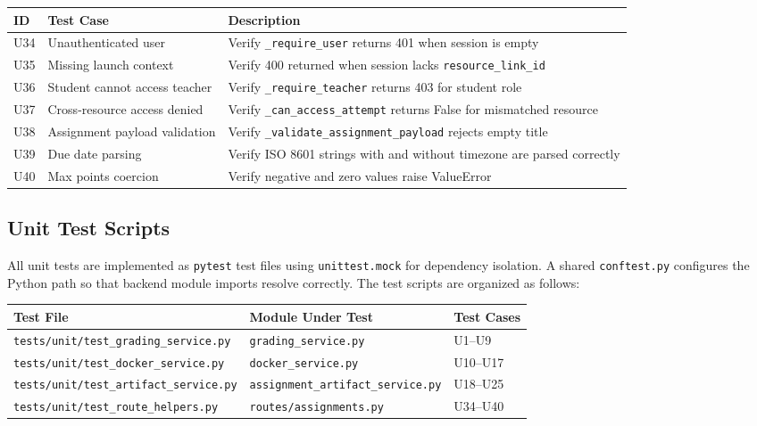 \documentclass[12pt, letterpaper]{article}
\begin{document}
\begin{longtable}{p{0.5cm} p{4.5cm} p{8.5cm}}
    \toprule
    \textbf{ID} & \textbf{Test Case} & \textbf{Description} \\
    \midrule
    U34 & Unauthenticated user & Verify \texttt{\_require\_user} returns 401 when session is empty \\
    U35 & Missing launch context & Verify 400 returned when session lacks \texttt{resource\_link\_id} \\
    U36 & Student cannot access teacher & Verify \texttt{\_require\_teacher} returns 403 for student role \\
    U37 & Cross-resource access denied & Verify \texttt{\_can\_access\_attempt} returns False for mismatched resource \\
    U38 & Assignment payload validation & Verify \texttt{\_validate\_assignment\_payload} rejects empty title \\
    U39 & Due date parsing & Verify ISO 8601 strings with and without timezone are parsed correctly \\
    U40 & Max points coercion & Verify negative and zero values raise ValueError \\
    \bottomrule
\end{longtable}

\subsection{Unit Test Scripts}

All unit tests are implemented as \texttt{pytest} test files using \texttt{unittest.mock} for dependency isolation. A shared \texttt{conftest.py} configures the Python path so that backend module imports resolve correctly. The test scripts are organized as follows:

\begin{longtable}{p{6.5cm} p{4cm} p{3cm}}
    \toprule
    \textbf{Test File} & \textbf{Module Under Test} & \textbf{Test Cases} \\
    \midrule
    \texttt{tests/unit/test\_grading\_service.py} & \texttt{grading\_service.py} & U1--U9 \\
    \texttt{tests/unit/test\_docker\_service.py} & \texttt{docker\_service.py} & U10--U17 \\
    \texttt{tests/unit/test\_artifact\_service.py} & \texttt{assignment\_artifact\_service.py} & U18--U25 \\
    \texttt{tests/unit/test\_route\_helpers.py} & \texttt{routes/assignments.py} & U34--U40 \\
    \bottomrule
\end{longtable}
\end{document}
